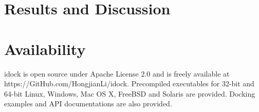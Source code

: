 \documentclass[10pt, conference, compsocconf]{../IEEEtran}
\begin{document}
\section{Results and Discussion}



\section{Availability}

idock is open source under Apache License 2.0 and is freely available at https://GitHub.com/HongjianLi/idock. Precompiled executables for 32-bit and 64-bit Linux, Windows, Mac OS X, FreeBSD and Solaris are provided. Docking examples and API documentations are also provided.



\end{document}
